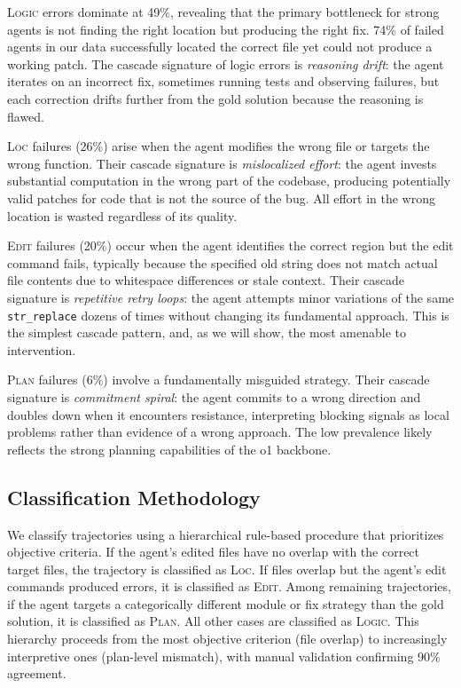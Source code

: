 \documentclass[11pt]{article}
\begin{document}
\textsc{Logic} errors dominate at 49\%, revealing that the primary bottleneck for strong agents is not finding the right location but producing the right fix.
74\% of failed agents in our data successfully located the correct file yet could not produce a working patch.
The cascade signature of logic errors is \textit{reasoning drift}: the agent iterates on an incorrect fix, sometimes running tests and observing failures, but each correction drifts further from the gold solution because the reasoning is flawed.

\textsc{Loc} failures (26\%) arise when the agent modifies the wrong file or targets the wrong function.
Their cascade signature is \textit{mislocalized effort}: the agent invests substantial computation in the wrong part of the codebase, producing potentially valid patches for code that is not the source of the bug.
All effort in the wrong location is wasted regardless of its quality.

\textsc{Edit} failures (20\%) occur when the agent identifies the correct region but the edit command fails, typically because the specified old string does not match actual file contents due to whitespace differences or stale context.
Their cascade signature is \textit{repetitive retry loops}: the agent attempts minor variations of the same \texttt{str\_replace} dozens of times without changing its fundamental approach.
This is the simplest cascade pattern, and, as we will show, the most amenable to intervention.

\textsc{Plan} failures (6\%) involve a fundamentally misguided strategy.
Their cascade signature is \textit{commitment spiral}: the agent commits to a wrong direction and doubles down when it encounters resistance, interpreting blocking signals as local problems rather than evidence of a wrong approach.
The low prevalence likely reflects the strong planning capabilities of the o1 backbone.

\subsection{Classification Methodology}

We classify trajectories using a hierarchical rule-based procedure that prioritizes objective criteria.
If the agent's edited files have no overlap with the correct target files, the trajectory is classified as \textsc{Loc}.
If files overlap but the agent's edit commands produced errors, it is classified as \textsc{Edit}.
Among remaining trajectories, if the agent targets a categorically different module or fix strategy than the gold solution, it is classified as \textsc{Plan}.
All other cases are classified as \textsc{Logic}.
This hierarchy proceeds from the most objective criterion (file overlap) to increasingly interpretive ones (plan-level mismatch), with manual validation confirming 90\% agreement.
\end{document}
